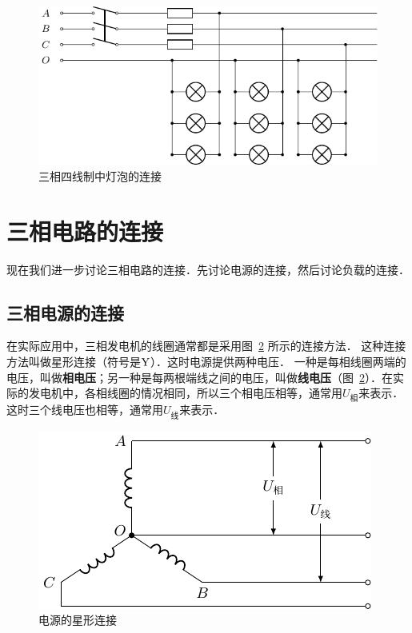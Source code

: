 \begin{figure}[htbp]
    \centering
    \includegraphics{fig/C/3-46.pdf}
    \caption{三相四线制中灯泡的连接}\label{fig_C_3-46}
\end{figure}

\section{三相电路的连接}
现在我们进一步讨论三相电路的连接．先讨论电源的连接，然后讨论负载的连接．

\subsection{三相电源的连接}

在实际应用中，三相发电机的线圈通常都是采用图~\ref{fig_C_3-47} 所示的连接方法．
这种连接方法叫做星形连接（符号是$\rm{Y}$）．这时电源提供两种电压．
一种是每相线圈两端的电压，叫做\textbf{相电压}；另一种是每两根端线之间的电压，叫做\textbf{线电压}（图~\ref{fig_C_3-47}）．在实际的发电机中，各相线圈的情况相同，所以三个相电压相等，通常用$U_{\text{相}}$来表示．这时三个线电压也相等，通常用$U_{\text{线}}$来表示．
\begin{figure}[htbp]
    \centering
    \includegraphics{fig/C/3-47.pdf}
    \caption{电源的星形连接}\label{fig_C_3-47}
\end{figure}

